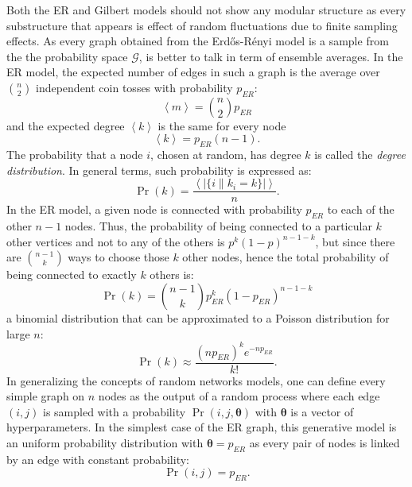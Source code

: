 Both the ER and Gilbert models should not show any modular structure as every substructure that appears is effect of random fluctuations due to finite sampling effects.
As every graph obtained from the Erd\H{o}s-Rényi model is a sample from the the probability space $\mathcal{G}$, is better to talk in term of ensemble averages. In the ER model, the expected number of edges in such a graph is the average over $\binom{n}{2}$ independent coin tosses with probability $p_{ER}$:
\begin{equation}
\left< m  \right> = \binom{n}{2}p_{ER}
\end{equation}
and the expected degree $\left< k \right>$ is the same for every node
\begin{equation}
\left< k \right> = p_{ER}(n-1).
\end{equation}
The probability that a node $i$, chosen at random, has degree $k$ is called the \emph{degree distribution}. In general terms, such probability is expressed as:
\begin{equation}
\Pr(k) = \frac{\left< |\{ i \| k_i=k \}| \right>}{n}.
\end{equation}
In the ER model, a given node is connected with probability $p_{ER}$ to each of the other $n-1$ nodes. Thus, the probability of being connected to a particular $k$ other vertices and not to any of the others is $p^k(1-p)^{n-1-k}$, but since there are $\binom{n-1}{k}$ ways to choose those $k$ other nodes, hence the total probability of being connected to exactly $k$ others is:
\begin{equation}
\Pr(k) = \binom{n-1}{k}p_{ER}^k(1-p_{ER})^{n-1-k}
\end{equation}
a binomial distribution that can be approximated to a Poisson distribution for large $n$:
\begin{equation}
\Pr(k) \approx \frac{(n p_{ER})^k e^{-n p_{ER}} }{k!}.
\end{equation}
\bigbreak
In generalizing the concepts of random networks models, one can define every simple graph on $n$ nodes as the output of a random process where each edge $(i,j) $ is sampled with a probability $\Pr(i,j,{\boldsymbol \theta})$ with $\boldsymbol \theta$ is a vector of hyperparameters. In the simplest case of the ER graph, this generative model is an uniform probability distribution with $\boldsymbol \theta=p_{ER}$ as every pair of nodes is linked by an edge with constant probability:
\begin{equation}
\Pr(i,j) = p_{ER}.
\end{equation}

